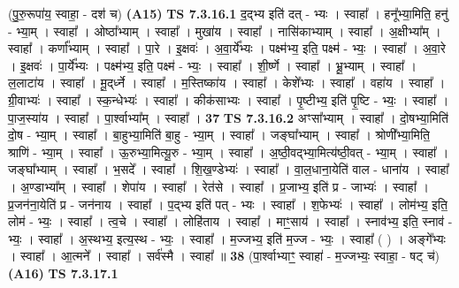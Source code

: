 \documentclass[17pt]{extarticle}
\begin{document}
                  \newline
                      (पु॒रु॒रूपा॑य॒ स्वाहा॒ - दश॑ च)  \textbf{(A15)} \newline \newline
                                \textbf{ TS 7.3.16.1} \newline
                  द॒द्भ्य इति॑ दत् - भ्यः । स्वाहा᳚ । हनू᳚भ्या॒मिति॒ हनु॑ - भ्या॒म् । स्वाहा᳚ । ओष्ठा᳚भ्याम् । स्वाहा᳚ । मुखा॑य । स्वाहा᳚ । नासि॑काभ्याम् । स्वाहा᳚ । अ॒क्षीभ्या᳚म् । स्वाहा᳚ । कर्णा᳚भ्याम् । स्वाहा᳚ । पा॒रे । इ॒क्षवः॑ । अ॒वा॒र्ये᳚भ्यः । पक्ष्म॑भ्य॒ इति॒ पक्ष्म॑ - भ्यः॒ । स्वाहा᳚ । अ॒वा॒रे । इ॒क्षवः॑ । पा॒र्ये᳚भ्यः । पक्ष्म॑भ्य॒ इति॒ पक्ष्म॑ - भ्यः॒ । स्वाहा᳚ । शी॒र्ष्णे । स्वाहा᳚ । भ्रू॒भ्याम् । स्वाहा᳚ । ल॒लाटा॑य । स्वाहा᳚ । मू॒द्‌र्ध्ने । स्वाहा᳚ । म॒स्तिष्का॑य । स्वाहा᳚ । केशे᳚भ्यः । स्वाहा᳚ । वहा॑य । स्वाहा᳚ । ग्री॒वाभ्यः॑ । स्वाहा᳚ । स्क॒न्धेभ्यः॑ । स्वाहा᳚ । कीक॑साभ्यः । स्वाहा᳚ । पृ॒ष्टीभ्य॒ इति॑ पृ॒ष्टि - भ्यः॒ । स्वाहा᳚ । पा॒ज॒स्या॑य । स्वाहा᳚ । पा॒र्श्वाभ्या᳚म् । स्वाहा᳚ । \textbf{  37} \newline
                  \newline
                                \textbf{ TS 7.3.16.2} \newline
                  अꣳसा᳚भ्याम् । स्वाहा᳚ । दो॒षभ्या॒मिति॑ दो॒ष - भ्या॒म् । स्वाहा᳚ । बा॒हुभ्या॒मिति॑ बा॒हु - भ्या॒म् । स्वाहा᳚ । जङ्घा᳚भ्याम् । स्वाहा᳚ । श्रोणी᳚भ्या॒मिति॒ श्राणि॑ - भ्या॒म् । स्वाहा᳚ । ऊ॒रुभ्या॒मित्यू॒रु - भ्या॒म् । स्वाहा᳚ । अ॒ष्ठी॒वद्भ्या॒मित्य॑ष्ठी॒वत् - भ्या॒म् । स्वाहा᳚ । जङ्घा᳚भ्याम् । स्वाहा᳚ । भ॒सदे᳚ । स्वाहा᳚ । शि॒ख॒ण्डेभ्यः॑ । स्वाहा᳚ । वा॒ल॒धाना॒येति॑ वाल - धाना॑य । स्वाहा᳚ । अ॒ण्डाभ्या᳚म् । स्वाहा᳚ । शेपा॑य । स्वाहा᳚ । रेत॑से । स्वाहा᳚ । प्र॒जाभ्य॒ इति॑ प्र - जाभ्यः॑ । स्वाहा᳚ । प्र॒जन॑ना॒येति॑ प्र - जन॑नाय । स्वाहा᳚ । प॒द्भ्य इति॑ पत् - भ्यः । स्वाहा᳚ । श॒फेभ्यः॑ । स्वाहा᳚ । लोम॑भ्य॒ इति॒ लोम॑ - भ्यः॒ । स्वाहा᳚ । त्व॒चे । स्वाहा᳚ । लोहि॑ताय । स्वाहा᳚ । माꣳ॒॒साय॑ । स्वाहा᳚ । स्नाव॑भ्य॒ इति॒ स्नाव॑ - भ्यः॒ । स्वाहा᳚ । अ॒स्थभ्य॒ इत्य॒स्थ - भ्यः॒ । स्वाहा᳚ । म॒ज्जभ्य॒ इति॑ म॒ज्ज - भ्यः॒ । स्वाहा᳚ ( ) । अङ्गे᳚भ्यः । स्वाहा᳚ । आ॒त्मने᳚ । स्वाहा᳚ । सर्व॑स्मै । स्वाहा᳚ ॥ \textbf{  38} \newline
                  \newline
                      (पा॒र्श्वाभ्याꣳ॒॒ स्वाहा॑ - म॒ज्जभ्यः॒ स्वाहा॒ - षट् च॑)  \textbf{(A16)} \newline \newline
                                \textbf{ TS 7.3.17.1} \newline
\end{document}
